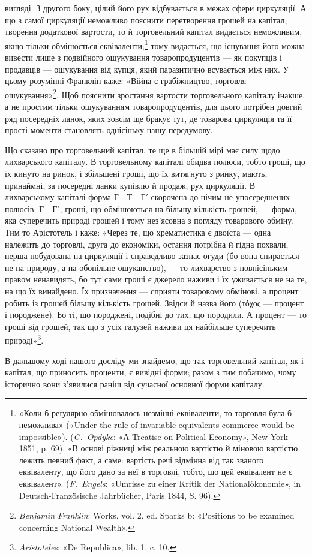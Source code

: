 \parcont{}  %
вигляді. З другого боку, цілий його рух відбувається в межах
сфери циркуляції. А що з самої циркуляції неможливо пояснити
перетворення грошей на капітал, творення додаткової вартости,
то й торговельний капітал видається неможливим, якщо тільки
обмінюється еквіваленти;\footnote{
«Коли б реґулярно обмінювалось незмінні еквіваленти, то торговля
була б неможлива» («Under the rule of invariable equivalents commerce
would be impossible»). (\emph{G.~Opdyke}: «А Treatise on Political Economy»,
New-York 1851, p. 69). «В основі ріжниці між реальною вартістю й
міновою вартістю лежить певний факт, а саме: вартість речі відмінна
від так званого еквіваленту, що його дано за неї в торговлі, тобто, що
цей еквівалент не є еквівалент». (\emph{F.~Engels}: «Umrisse zu einer Kritik
der Nationalökonomie», in Deutsch-Französische Jahrbücher, Paris 1844,
S. 96).
} тому видається, що існування його
можна вивести лише з подвійного ошукування товаропродуцентів —
як покупців і продавців — ошукування від купця, який паразитично
всувається між них. У цьому розумінні Франклін каже:
«Війна є грабіжництво, торговля — ошукування»\footnote{
\emph{Benjamin Franklin}: Works, vol. 2, ed. Sparks b: «Positions to be
examined concerning National Wealth».
}. Щоб пояснити
зростання вартости торговельного капіталу інакше, а не
простим тільки ошукуванням товаропродуцентів, для цього потрібен
довгий ряд посередніх ланок, яких зовсім ще бракує тут,
де товарова циркуляція та її прості моменти становлять однісіньку
нашу передумову.

Що сказано про торговельний капітал, те ще в більшій мірі
має силу щодо лихварського капіталу. В торговельному капіталі
обидва полюси, тобто гроші, що їх кинуто на ринок, і збільшені
гроші, що їх витягнуто з ринку, мають, принаймні, за посередні
ланки купівлю й продаж, рух циркуляції. В лихварському капіталі
форма $Г — Т — Г'$ скорочена до нічим не упосереднених полюсів:
$Г — Г'$, гроші, що обмінюються на більшу кількість грошей, —
форма, яка суперечить природі грошей і тому нез’ясовна з погляду
товарового обміну. Тим то Арістотель і каже: «Через те,
що хрематистика є двоїста — одна належить до торговлі, друга до
економіки, остання потрібна й гідна похвали, перша побудована
на циркуляції і справедливо зазнає огуди (бо вона спирається не
на природу, а на обопільне ошуканство), — то лихварство з повнісіньким
правом ненавидять, бо тут сами гроші є джерело наживи
і їх уживається не на те, на що їх винайдено. Їх призначення —
сприяти товаровому обмінові, а процент робить із грошей більшу
кількість грошей. Звідси й назва його (\textgreek{τόχος} — процент і породжене).
Бо ті, що породжені, подібні до тих, що породили. А процент
— то гроші від грошей, так що з усіх галузей наживи ця
найбільше суперечить природі»\footnote{
\emph{Aristoteles}: «De Republica», lib. 1, c. 10.
}.

В дальшому ході нашого досліду ми знайдемо, що так торговельний
капітал, як і капітал, що приносить проценти, є вивідні
форми; разом з тим побачимо, чому історично вони з’явилися
раніш від сучасної основної форми капіталу.

